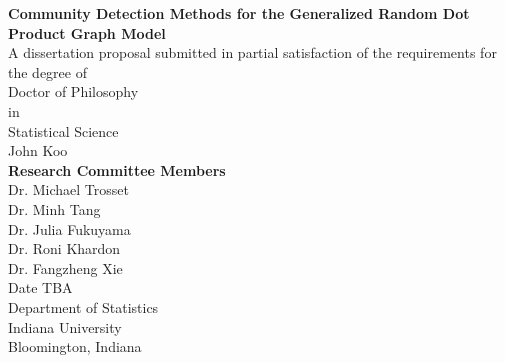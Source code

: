 \documentclass[
  11pt,
]{article}
\author{}
\date{\vspace{-2.5em}}
\begin{document}

\begin{center}
\LARGE{\textbf{Community Detection Methods for the Generalized Random Dot Product Graph Model}}\\
\vspace*{2\baselineskip}
\normalsize{A dissertation proposal submitted in partial satisfaction of the requirements for the degree of \\}
Doctor of Philosophy \\
in \\
Statistical Science \\
\vspace*{2\baselineskip}
\Large{John Koo}\\
\vspace*{3\baselineskip}
\Large{\textbf{Research Committee Members}}\\
Dr. Michael Trosset \\
Dr. Minh Tang \\
Dr. Julia Fukuyama \\
Dr. Roni Khardon \\
Dr. Fangzheng Xie \\
\vspace*{3\baselineskip}
Date TBA \\
\vspace*{1\baselineskip}
Department of Statistics \\
Indiana University \\
Bloomington, Indiana \\
\end{center}

\hypersetup{linkcolor = black}
\newpage
{}
\tableofcontents
{}

\newpage

\newpage
{}
\hypersetup{linkcolor = blue}

\newcommand{\diag}{\text{diag}}
\newcommand{\tr}{\text{Tr}}
\newcommand{\blockdiag}{\text{blockdiag}}
\newcommand{\indep}{\stackrel{\text{ind}}{\sim}}
\newcommand{\iid}{\stackrel{\text{iid}}{\sim}}
\newcommand{\Bernoulli}{\text{Bernoulli}}
\newcommand{\Betadist}{\text{Beta}}
\newcommand{\BG}{\text{BernoulliGraph}}
\newcommand{\Cat}{\text{Categorical}}
\newtheorem{definition}{Definition}
\newtheorem{theorem}{Theorem}
\newtheorem{lemma}{Lemma}
\theoremstyle{remark}
\newtheorem*{remark}{Remark}
\theoremstyle{example}
\newtheorem*{example}{Example}
\end{document}
